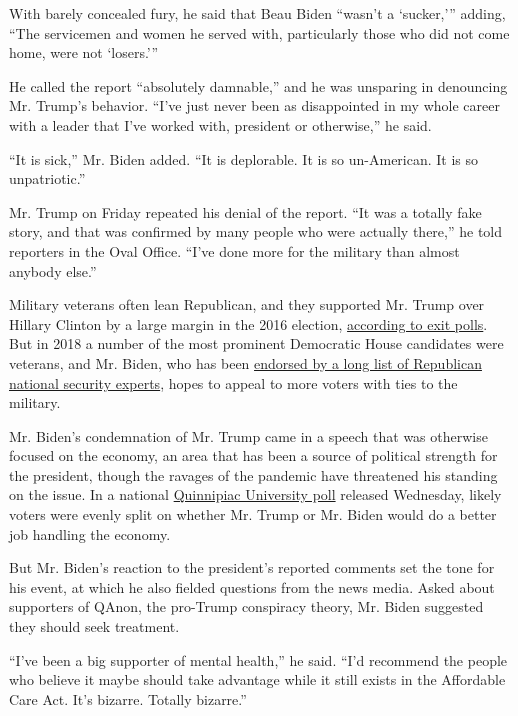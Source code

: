 With barely concealed fury, he said that Beau Biden ``wasn't a
`sucker,''' adding, ``The servicemen and women he served with,
particularly those who did not come home, were not `losers.'''

He called the report ``absolutely damnable,'' and he was unsparing in
denouncing Mr. Trump's behavior. ``I've just never been as disappointed
in my whole career with a leader that I've worked with, president or
otherwise,'' he said.

``It is sick,'' Mr. Biden added. ``It is deplorable. It is so
un-American. It is so unpatriotic.''

Mr. Trump on Friday repeated his denial of the report. ``It was a
totally fake story, and that was confirmed by many people who were
actually there,'' he told reporters in the Oval Office. ``I've done more
for the military than almost anybody else.''

Military veterans often lean Republican, and they supported Mr. Trump
over Hillary Clinton by a large margin in the 2016 election,
\href{https://www.nytimes3xbfgragh.onion/interactive/2016/11/08/us/politics/election-exit-polls.html}{according
to exit polls}. But in 2018 a number of the most prominent Democratic
House candidates were veterans, and Mr. Biden, who has been
\href{https://www.nytimes3xbfgragh.onion/2020/08/20/us/politics/republican-national-security-biden.html}{endorsed
by a long list of Republican national security experts}, hopes to appeal
to more voters with ties to the military.

Mr. Biden's condemnation of Mr. Trump came in a speech that was
otherwise focused on the economy, an area that has been a source of
political strength for the president, though the ravages of the pandemic
have threatened his standing on the issue. In a national
\href{https://poll.qu.edu/national/release-detail?ReleaseID=3671}{Quinnipiac
University poll} released Wednesday, likely voters were evenly split on
whether Mr. Trump or Mr. Biden would do a better job handling the
economy.

But Mr. Biden's reaction to the president's reported comments set the
tone for his event, at which he also fielded questions from the news
media. Asked about supporters of QAnon, the pro-Trump conspiracy theory,
Mr. Biden suggested they should seek treatment.

``I've been a big supporter of mental health,'' he said. ``I'd recommend
the people who believe it maybe should take advantage while it still
exists in the Affordable Care Act. It's bizarre. Totally bizarre.''

